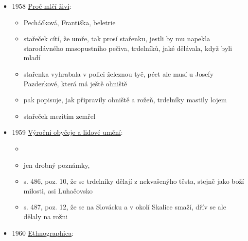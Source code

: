 \begin{itemize}
\begin{itemize}
    \begin{itemize}
    \tightlist
    \item
      s. 166: zabile hodulo a prase, pozvale celo dědino jak na primici,
      matička napekla vdolku a vdolečku, aji božich milosťé a trdelniku
    \item
      to zní jako povídka
      \protect{}\label{Oux20chropiux148skuxfdchux20moresuxedch}{}\textbf{O
      chropiňských moresích}, co už tu několikrát byla
    \end{itemize}
  \end{itemize}
\item
  1958
  \href{https://ceskadigitalniknihovna.cz/uuid/uuid:4d82e3c0-db26-11e2-9923-005056827e52}{Proč
  mlčí živí}:

  \begin{itemize}
  \tightlist
  \item
    Pecháčková, Františka, beletrie
  \item
    stařeček cítí, že umře, tak prosí stařenku, jestli by mu napekla
    starodávného masopustního pečiva, trdelníků, jaké dělávala, když
    byli mladí
  \item
    stařenka vyhrabala v polici železnou tyč, péct ale musí u Josefy
    Pazderkové, která má ještě ohniště
  \item
    pak popisuje, jak připravily ohniště a rožeň, trdelníky mastily
    lojem
  \item
    stařeček mezitím zemřel
  \end{itemize}
\item
  1959
  \href{https://ceskadigitalniknihovna.cz/uuid/uuid:d7bb5685-7a29-11ed-b508-001b63bd97ba}{Výroční
  obyčeje a lidové umění}:

  \begin{itemize}
  \tightlist
  \item
  \item
    jen drobný poznámky,
  \item
    s. 486, poz. 10, že se trdelníky dělají z nekvašenýho těsta, stejně
    jako boží milosti, asi Luhačovsko
  \item
    s. 487, poz. 12, že se na Slovácku a v okolí Skalice smaží, dřív se
    ale dělaly na rožni
  \end{itemize}
\item
  1960
  \href{https://ceskadigitalniknihovna.cz/view/uuid:747980d0-a9c9-11e7-920d-005056827e51?page=uuid\%3A6d279530-a5e3-11e8-8b41-005056822549&fulltext=trdlovec&source=nkp}{Ethnographica}:


\end{itemize}
